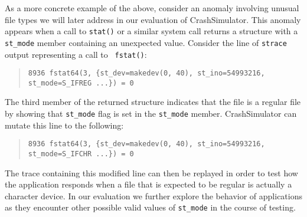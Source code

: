 
As a more concrete example of the above, consider an anomaly
involving unusual file types we will later address in our evaluation of
CrashSimulator.  This anomaly appears when a call to {\tt stat()} or a similar system
call returns a structure with a {\tt st\_mode} member containing an unexpected
value. Consider the line of {\tt strace} output representing a call to {\tt
  fstat()}:
\begin{quote}
  {\tt 8936  fstat64(3, \{st\_dev=makedev(0, 40), st\_ino=54993216, st\_mode=S\_IFREG ...\}) = 0}
\end{quote}
The third member of the returned structure indicates that the file is a
regular file by showing that {\tt st\_mode} flag is set in the {\tt st\_mode}
member.  CrashSimulator can mutate this  line to the following:

\begin{quote}
  {\tt 8936  fstat64(3, \{st\_dev=makedev(0, 40), st\_ino=54993216, st\_mode=S\_IFCHR ...\}) = 0}
\end{quote}

The trace containing this modified line can then be replayed in order to
test how the application responds when a file that is expected to be
regular is actually a character device. In our evaluation we further
explore the behavior of applications as they encounter other possible valid
values of {\tt st\_mode} in the course of testing.


